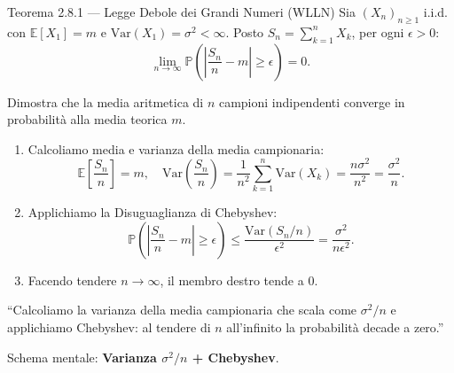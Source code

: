 \documentclass[11pt,a4paper]{report}
\begin{document}
\begin{teoremabox}{Teorema 2.8.1 --- Legge Debole dei Grandi Numeri (WLLN)}
Sia $(X_n)_{n \ge 1}$ i.i.d. con $\mathbb{E}[X_1] = m$ e $\mathrm{Var}(X_1) = \sigma^2 < \infty$. Posto $S_n = \sum_{k=1}^n X_k$, per ogni $\epsilon > 0$:
\[
\lim_{n \to \infty} \mathbb{P}\left(\left| \frac{S_n}{n} - m \right| \ge \epsilon\right) = 0.
\]

\begin{cosafa}
Dimostra che la media aritmetica di $n$ campioni indipendenti converge in probabilità alla media teorica $m$.
\end{cosafa}

\begin{dimostrazione}
\begin{enumerate}
    \item Calcoliamo media e varianza della media campionaria:
    \[
    \mathbb{E}\left[\frac{S_n}{n}\right] = m, \quad \mathrm{Var}\left(\frac{S_n}{n}\right) = \frac{1}{n^2} \sum_{k=1}^n \mathrm{Var}(X_k) = \frac{n\sigma^2}{n^2} = \frac{\sigma^2}{n}.
    \]
    \item Applichiamo la Disuguaglianza di Chebyshev:
    \[
    \mathbb{P}\left(\left| \frac{S_n}{n} - m \right| \ge \epsilon\right) \le \frac{\mathrm{Var}(S_n/n)}{\epsilon^2} = \frac{\sigma^2}{n \epsilon^2}.
    \]
    \item Facendo tendere $n \to \infty$, il membro destro tende a $0$.
\end{enumerate}
\end{dimostrazione}

\begin{oralbox}
``Calcoliamo la varianza della media campionaria che scala come $\sigma^2/n$ e applichiamo Chebyshev: al tendere di $n$ all'infinito la probabilità decade a zero.''
\end{oralbox}

\begin{tipbox}
Schema mentale: \textbf{Varianza $\sigma^2/n$ + Chebyshev}.
\end{tipbox}
\end{teoremabox}

\vspace{0.3cm}
\end{document}
